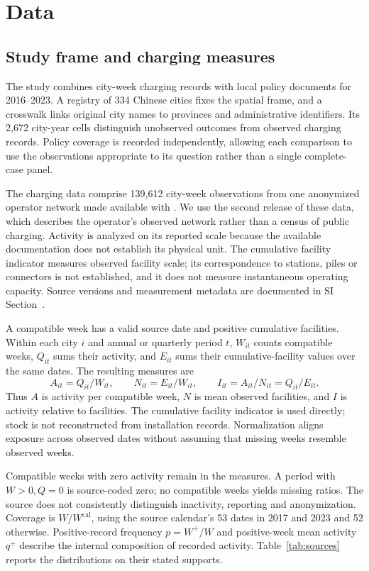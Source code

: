 \section{Data}
\subsection{Study frame and charging measures}
The study combines city-week charging records with local policy documents for 2016--2023. A registry of 334 Chinese cities fixes the spatial frame, and a crosswalk links original city names to provinces and administrative identifiers. Its 2,672 city-year cells distinguish unobserved outcomes from observed charging records. Policy coverage is recorded independently, allowing each comparison to use the observations appropriate to its question rather than a single complete-case panel.

The charging data comprise 139,612 city-week observations from one anonymized operator network made available with \citet{ma2026}. We use the second release of these data, which describes the operator's observed network rather than a census of public charging. Activity is analyzed on its reported scale because the available documentation does not establish its physical unit. The cumulative facility indicator measures observed facility scale; its correspondence to stations, piles or connectors is not established, and it does not measure instantaneous operating capacity. Source versions and measurement metadata are documented in SI Section~.

A compatible week has a valid source date and positive cumulative facilities. Within each city $i$ and annual or quarterly period $t$, $W_{it}$ counts compatible weeks, $Q_{it}$ sums their activity, and $E_{it}$ sums their cumulative-facility values over the same dates. The resulting measures are
\begin{equation}
A_{it}=Q_{it}/W_{it},\qquad N_{it}=E_{it}/W_{it},\qquad I_{it}=A_{it}/N_{it}=Q_{it}/E_{it}.
\label{eq:metrics}
\end{equation}
Thus $A$ is activity per compatible week, $N$ is mean observed facilities, and $I$ is activity relative to facilities. The cumulative facility indicator is used directly; stock is not reconstructed from installation records. Normalization aligns exposure across observed dates without assuming that missing weeks resemble observed weeks.

Compatible weeks with zero activity remain in the measures. A period with $W>0,Q=0$ is source-coded zero; no compatible weeks yields missing ratios. The source does not consistently distinguish inactivity, reporting and anonymization. Coverage is $W/W^{\mathrm{cal}}$, using the source calendar's 53 dates in 2017 and 2023 and 52 otherwise. Positive-record frequency $p=W^+/W$ and positive-week mean activity $q^+$ describe the internal composition of recorded activity. Table~\ref{tab:sources} reports the distributions on their stated supports.


